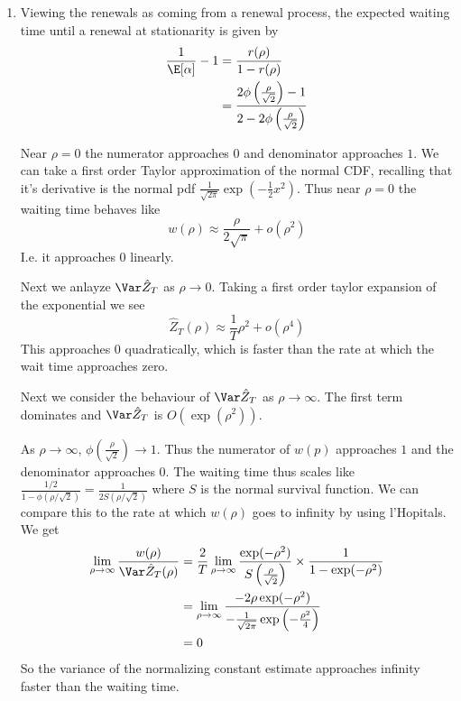 \documentclass{article}
\begin{document}
\begin{enumerate}
    \item %
    Viewing the renewals as coming from a renewal process,
    the expected waiting time until a renewal at stationarity is given by 
    \begin{align}
        \frac{1}{\E[\alpha]} - 1 &= 
        \frac{r(\rho)}{1 - r(\rho)} \\ &=
            \frac{2\phi\left(\frac{\rho}{\sqrt{2}}\right) - 1}
            {2 -2\phi\left(\frac{\rho}{\sqrt{2}}\right)} \\
    \end{align}

    Near $\rho=0$ the numerator approaches $0$ and denominator approaches $1$.
    We can take a first order Taylor approximation of the normal CDF, recalling
    that it's derivative is the normal pdf $\frac{1}{\sqrt{2\pi}}\exp\left(-\frac 1 2 x^2\right)$.
    Thus near $\rho=0$ the waiting time behaves like
    \[
        w(\rho) \approx \frac{\rho}{2\sqrt{\pi}} + o(\rho^2)
    \]
    I.e. it approaches $0$ linearly.

    Next we anlayze $\Var \hat Z_T$ as $\rho \to 0$. Taking
    a first order taylor expansion of the exponential we see 
    \[ 
        \hat Z_T(\rho) \approx \frac{1}{T}\rho^2 + o(\rho^4)
    \]
    This approaches $0$ quadratically, which is faster than the rate at which
    the wait time approaches zero.

    Next we consider the behaviour of $\Var \hat Z_T$ as $\rho \to \infty$.
    The first term dominates and $\Var \hat Z_T$ is
    $O\left( \exp(\rho^2) \right)$.

    As $\rho \to \infty$, $\phi\left(\frac{\rho}{\sqrt{2}}\right) \to 1$. Thus the
    numerator of $w(p)$ approaches $1$ and the denominator approaches $0$.
    The waiting time thus scales like
    $\frac{1/2}{1-\phi(\rho/\sqrt{2})} = \frac{1}{2S(\rho/\sqrt{2})}$ where $S$ is the normal survival
    function. We can compare this to the rate at which $w(\rho)$ goes to infinity
    by using l'Hopitals. We get
    \begin{align}
        \lim_{\rho\to\infty} \frac{w(\rho)}{\Var \hat Z_T (\rho)} 
        &=  \frac{2}{T}\lim_{\rho\to\infty} \frac{\exp(-\rho^2)}{S\left(\frac{\rho}{\sqrt{2}}\right)}
        \times \frac{1}{1-\exp(-\rho^2)}\\
        &= \lim_{\rho\to\infty} \frac{-2\rho\exp(-\rho^2)}
            {-\frac{1}{\sqrt{2\pi}}\exp\left(-\frac{\rho^2}{4}\right)} \\
        &= 0
    \end{align}
    So the variance of the normalizing constant estimate approaches infinity
    faster than the waiting time.


\end{enumerate}
\end{document}
